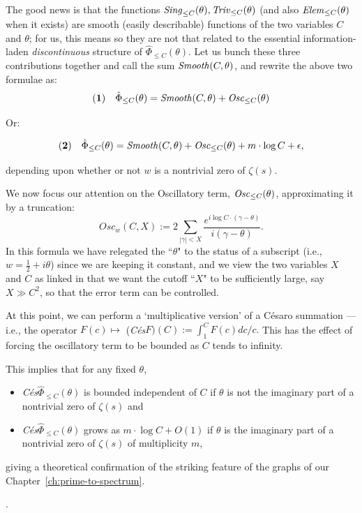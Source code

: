 \documentclass[openany]{book}
\theoremstyle{plain}
\theoremstyle{definition}
\begin{document}
{{{                     The good news is that  the functions ${\it Sing}_{\le C}(\theta),  {\it Triv}_{\le C}(\theta)$ (and also ${\it Elem}_{\le C}(\theta)$ when it exists) are smooth (easily describable) functions of the two variables $C$ and $\theta$; for us, this means so they are not that related to the essential information-laden {\it discontinuous} structure of  $ {\hat \Phi}_{\le C}(\theta)$. Let us bunch these three contributions together and call the sum ${\it Smooth}(C,\theta)$, and rewrite the above two formulae as:
                       $$ {\bf(1)}\ \ \ {\hat \Phi}_{\le C}(\theta) ={\it Smooth}(C,\theta) +  {\it Osc}_{\le C}(\theta) $$

           Or:

           $${\bf(2)}\ \ \ {\hat \Phi}_{\le C}(\theta) = {\it Smooth}(C,\theta)+  {\it Osc}_{\le C}(\theta) +  m\cdot \log C +\epsilon,$$

           depending upon whether or not $w$ is a nontrivial zero of $\zeta(s)$.


 We now focus our attention on the Oscillatory term,  ${\it Osc}_{\le C}(\theta) $, approximating it by a truncation:  $$Osc_w(C,X):=  2\sum_{|\gamma| <
 X} {{\frac{e^{i\log C\cdot (\gamma-\theta)}}{i(\gamma-\theta)}}}.$$ In this formula we have relegated the ``$\theta$" to the status of  a subscript (i.e., $w = {\frac{1}{2}} +i\theta$) since we are keeping it constant, and we view the two variables $X$ and $C$ as linked in that we want the cutoff ``$X$" to be sufficiently large, say $X \gg C^2$, so that the error term can be controlled.

 At this point, we can perform a `multiplicative version' of  a C{\'e}saro summation ---i.e.,  the operator $F(c) \mapsto$ ({\it C{\'e}s}$F)(C):= \int_1^CF(c) dc/c.$
This has the effect of forcing the oscillatory term to be bounded as $C$ tends to infinity.

 This implies that for any fixed $\theta$,  \begin{itemize} \item {\it C{\'e}s}${\hat \Phi}_{\le C}(\theta)$  is bounded independent of $C$  if  $\theta$ is not the imaginary part of a nontrivial zero of $\zeta(s)$  and
 \item {\it C{\'e}s}${\hat \Phi}_{\le C}(\theta)$ grows as $m\cdot \log C +O(1)$ if $\theta$ is the imaginary part of a nontrivial zero of $\zeta(s)$ of multiplicity $m$, \end{itemize} giving a theoretical confirmation of the striking feature of the graphs of our Chapter~\ref{ch:prime-to-spectrum}.}.


}}
\end{document}

